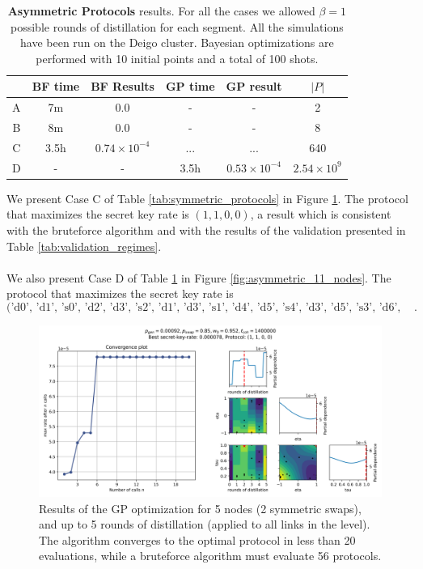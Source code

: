\documentclass{article}
\begin{document}
\begin{table}[ht]
    \centering
    \begin{tabular}{|c|c|c|c|c|c|}
        \hline
        & BF time & BF Results & GP time & GP result & $|P|$ \\
        \hline
        \hline
        A & 7m & 0.0 & - & - & 2 \\
        \hline
        B & 8m & 0.0 & - & - & 8 \\
        \hline
        C & 3.5h & $0.74 \times 10^{-4}$ & ... & ... & 640 \\
        \hline
        D & - & - & 3.5h & $0.53 \times 10^{-4}$ & $2.54 \times 10^9$ \\
        \hline
    \end{tabular}
    \caption{\textbf{Asymmetric Protocols} results. For all the cases we allowed $\beta=1$ possible rounds of distillation for each segment. All the simulations have been run on the Deigo cluster. Bayesian optimizations are performed with 10 initial points and a total of 100 shots.}
    \label{tab:asymmetric_protocols}
\end{table}

We present Case C of Table \ref{tab:symmetric_protocols} in Figure \ref{fig:symmetric_5_nodes}. The protocol that maximizes the secret key rate is $(1,1,0,0)$, a result which is consistent with the bruteforce algorithm and with the results of the validation presented in Table \ref{tab:validation_regimes}.
\\\\
We also present Case D of Table \ref{tab:asymmetric_protocols} in Figure \ref{fig:asymmetric_11_nodes}. The protocol that maximizes the secret key rate is 
\begin{equation*}
  \text{('d0', 'd1', 's0', 'd2', 'd3', 's2', 'd1', 'd3', 's1', 'd4', 'd5', 's4', 'd3', 'd5', 's3', 'd6', 'd7', 's6', 'd8', 'd9', 's8', 'd7', 'd9', 's7', 'd5', 'd9', 's5')} . 
\end{equation*}


\begin{figure}[ht!]
  \centering
  \includegraphics[width=\linewidth, trim = 10 10 10 50, clip]{symmetric/results_gp_centerspace/skopt_gp.png}
  \caption{Results of the GP optimization for 5 nodes (2 symmetric swaps), and up to 5 rounds of distillation (applied to all links in the level). The algorithm converges to the optimal protocol in less than 20 evaluations, while a bruteforce algorithm must evaluate 56 protocols.}
  \label{fig:symmetric_5_nodes}
\end{figure}
\end{document}
